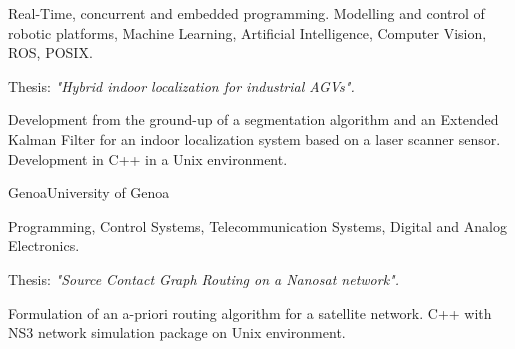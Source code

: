 \documentclass[11 pt,oneside,a4paper,titlepage]{article}
\begin{document}
{\begin{minipage}{11.3cm}
	{
		Real-Time, concurrent and embedded programming. 	
		Modelling and control of robotic platforms, Machine Learning, Artificial Intelligence, 
		Computer Vision, ROS, POSIX. 

		Thesis: \emph{"Hybrid indoor localization for industrial AGVs".}

		Development from the ground-up of a segmentation algorithm and an Extended Kalman Filter 
		for an indoor localization system based on a laser scanner sensor. 
		Development in C++ in a Unix environment.
	}
		
	\vspace*{0.22cm}
                                                    {Genoa}{University of Genoa}
	{
		Programming, Control Systems, Telecommunication Systems, Digital and Analog Electronics.
		
		Thesis: \emph{"Source Contact Graph Routing on a Nanosat network".} 

		Formulation of an a-priori routing algorithm for a satellite network. 
		C++ with NS3 network simulation package on Unix environment.
	}
\end{minipage}} %


\newpage

\end{document}

